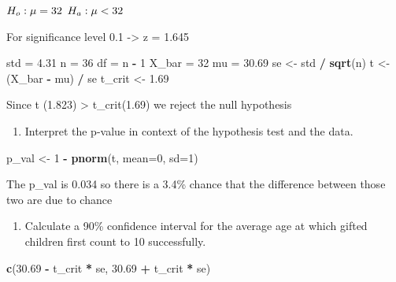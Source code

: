 \documentclass[
]{article}
\newenvironment{Shaded}{\begin{snugshade}}{\end{snugshade}}
\newcommand{\DataTypeTok}[1]{\textcolor[rgb]{0.13,0.29,0.53}{#1}}
\newcommand{\DecValTok}[1]{\textcolor[rgb]{0.00,0.00,0.81}{#1}}
\newcommand{\FloatTok}[1]{\textcolor[rgb]{0.00,0.00,0.81}{#1}}
\newcommand{\KeywordTok}[1]{\textcolor[rgb]{0.13,0.29,0.53}{\textbf{#1}}}
\newcommand{\NormalTok}[1]{#1}
\newcommand{\OperatorTok}[1]{\textcolor[rgb]{0.81,0.36,0.00}{\textbf{#1}}}
\newcommand{\StringTok}[1]{\textcolor[rgb]{0.31,0.60,0.02}{#1}}
\providecommand{\tightlist}{%
  \setlength{\itemsep}{0pt}\setlength{\parskip}{0pt}}
\begin{document}
\(H_o: \mu = 32 \\\) \(H_a: \mu < 32 \\\)

For significance level 0.1 -\textgreater{} z = 1.645

\begin{Shaded}
\begin{Highlighting}[]
\NormalTok{std =}\StringTok{ }\FloatTok{4.31}
\NormalTok{n =}\StringTok{ }\DecValTok{36}
\NormalTok{df =}\StringTok{ }\NormalTok{n }\OperatorTok{-}\StringTok{ }\DecValTok{1}
\NormalTok{X_bar =}\StringTok{ }\DecValTok{32}
\NormalTok{mu =}\StringTok{ }\FloatTok{30.69}
\NormalTok{se <-}\StringTok{ }\NormalTok{std }\OperatorTok{/}\StringTok{ }\KeywordTok{sqrt}\NormalTok{(n)}
\NormalTok{t <-}\StringTok{ }\NormalTok{(X_bar }\OperatorTok{-}\StringTok{ }\NormalTok{mu) }\OperatorTok{/}\StringTok{ }\NormalTok{se}
\NormalTok{t_crit <-}\StringTok{ }\FloatTok{1.69}
\end{Highlighting}
\end{Shaded}

Since t (1.823) \textgreater{} t\_crit(1.69) we reject the null
hypothesis

\begin{enumerate}
\def\labelenumi{(\alph{enumi})}
\setcounter{enumi}{2}
\tightlist
\item
  Interpret the p-value in context of the hypothesis test and the data.
\end{enumerate}

\begin{Shaded}
\begin{Highlighting}[]
\NormalTok{p_val <-}\StringTok{ }\DecValTok{1} \OperatorTok{-}\StringTok{ }\KeywordTok{pnorm}\NormalTok{(t, }\DataTypeTok{mean=}\DecValTok{0}\NormalTok{, }\DataTypeTok{sd=}\DecValTok{1}\NormalTok{)}
\end{Highlighting}
\end{Shaded}

The p\_val is 0.034 so there is a 3.4\% chance that the difference
between those two are due to chance

\begin{enumerate}
\def\labelenumi{(\alph{enumi})}
\setcounter{enumi}{3}
\tightlist
\item
  Calculate a 90\% confidence interval for the average age at which
  gifted children first count to 10 successfully.
\end{enumerate}

\begin{Shaded}
\begin{Highlighting}[]
\KeywordTok{c}\NormalTok{(}\FloatTok{30.69} \OperatorTok{-}\StringTok{ }\NormalTok{t_crit }\OperatorTok{*}\StringTok{ }\NormalTok{se, }\FloatTok{30.69} \OperatorTok{+}\StringTok{ }\NormalTok{t_crit }\OperatorTok{*}\StringTok{ }\NormalTok{se)}
\end{Highlighting}
\end{Shaded}
\end{document}
